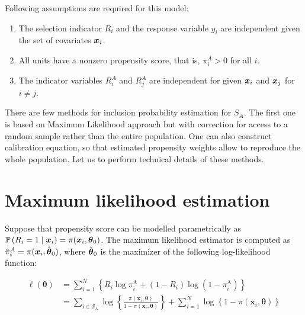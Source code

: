 \documentclass[
  letterpaper,
  DIV=11,
  numbers=noendperiod]{scrreprt}
\begin{document}
Following assumptions are required for this model:

\begin{enumerate}
\def\labelenumi{\arabic{enumi}.}
\item
  The selection indicator \(R_i\) and the response variable \(y_i\) are
  independent given the set of covariates \(\boldsymbol{x}_i\).
\item
  All units have a nonzero propensity score, that is, \(\pi_i^A > 0\)
  for all \(i\).
\item
  The indicator variables \(R_i^A\) and \(R_j^A\) are independent for
  given \(\boldsymbol{x}_i\) and \(\boldsymbol{x}_j\) for \(i \neq j\).
\end{enumerate}

There are few methods for inclusion probability estimation for \(S_A\).
The first one is based on Maximum Likelihood approach but with
correction for access to a random sample rather than the entire
population. One can also construct calibration equation, so that
estimated propensity weights allow to reproduce the whole population.
Let us to perform technical details of these methods.

\hypertarget{maximum-likelihood-estimation}{%
\section{Maximum likelihood
estimation}\label{maximum-likelihood-estimation}}

Suppose that propensity score can be modelled parametrically as
\(\mathbb{P}\left(R_i=1 \mid \boldsymbol{x}_i\right) = \pi(\boldsymbol{x}_{i}, \boldsymbol{\theta}_{0})\).
The maximum likelihood estimator is computed as
\(\hat{\pi}_{i}^{A} = \pi(\boldsymbol{x}_{i}, \hat{\boldsymbol{\theta}}_{0})\), where
\(\hat{\boldsymbol{\theta}}_{0}\) is the maximizer of the following log-likelihood
function:

\[
    \begin{split}
 \ell(\boldsymbol{\theta}) & =\sum_{i=1}^N\left\{R_i \log \pi_i^{\mathrm{A}}+\left(1-R_i\right) \log \left(1-\pi_i^{\mathrm{A}}\right)\right\} \\ & =\sum_{i \in \mathcal{S}_{\mathrm{A}}} \log \left\{\frac{\pi\left(\boldsymbol{x}_i, \boldsymbol{\theta}\right)}{1-\pi\left(\boldsymbol{x}_i, \boldsymbol{\theta}\right)}\right\}+\sum_{i=1}^N \log \left\{1-\pi\left(\boldsymbol{x}_i, \boldsymbol{\theta}\right)\right\}
    \end{split}
\]
\end{document}
